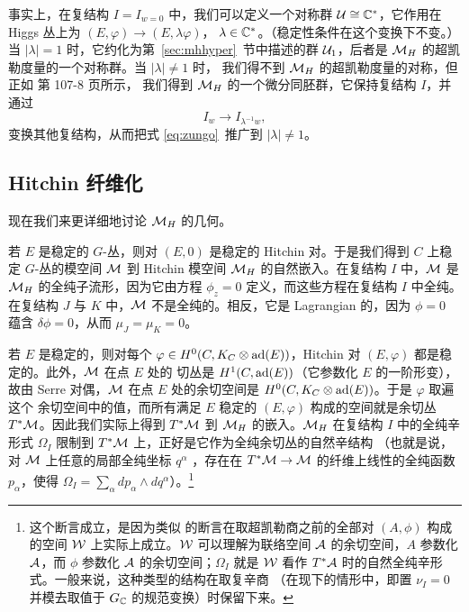 事实上，在复结构 $I=I_{w=0}$ 中，我们可以定义一个对称群 ${\cal U}\cong \Bbb{C}^*$，它作用在
Higgs 丛上为 $(E,\varphi)\to (E,\lambda\varphi)$，
$\lambda\in\Bbb{C}^*$。（稳定性条件在这个变换下不变。）当 $|\lambda|=1$ 时，它约化为第~\ref{sec:mhhyper}~节中描述的群
${\cal U}_1$，后者是 $\MH$ 的超凯勒度量的一个对称群。当 $|\lambda|\not=1$ 时，
我们得不到 $\MH$ 的超凯勒度量的对称，但正如 \cite{ref20} 第 107-8 页所示，
我们得到 $\MH$ 的一个微分同胚群，它保持复结构 $I$，并通过 %
\setcounter{equation}{22}
\begin{equation}\label{eq:trymodo}
I_w\to
I_{\lambda^{-1}w},
\end{equation}
 变换其他复结构，从而把式 \eqref{eq:zungo}\ 推广到
$|\lambda|\not=1$。

\subsection{Hitchin 纤维化}

\label{sec:hitchfib}

现在我们来更详细地讨论 $\MH$ 的几何。

若 $E$ 是稳定的 $G$-丛，则对 $(E,0)$ 是稳定的
Hitchin 对。于是我们得到 $C$ 上稳定 $G$-丛的模空间 $\M$ 到 Hitchin 模空间
$\MH$ 的自然嵌入。在复结构 $I$ 中，$\M$ 是 $\MH$ 的全纯子流形，因为它由方程
$\phi_z=0$ 定义，而这些方程在复结构 $I$ 中全纯。在复结构
$J$ 与 $K$ 中，$\M$ 不是全纯的。相反，它是 Lagrangian 的，因为 $\phi=0$ 蕴含 $\delta\phi=0$，从而
$\mu_J=\mu_K=0$。

若 $E$ 是稳定的，则对每个 $\varphi\in H^0(C,K_C\otimes\ad(E))$，Hitchin 对 $(E,\varphi)$ 都是稳定的。此外，${\EUM}$ 在点 $E$ 处的
切丛是 $H^1(C,\ad(E))$（它参数化 $E$ 的一阶形变），故由 Serre
对偶，$\M$ 在点 $E$ 处的余切空间是
$H^0(C,K_C\otimes\ad(E))$。于是 $\varphi$ 取遍这个
余切空间中的值，而所有满足 $E$ 稳定的 $(E,\varphi)$ 构成的空间就是余切丛
$T^*\M$。因此我们实际上得到
$T^*\M$ 到 $\MH$ 的嵌入。$\MH$ 在复结构 $I$ 中的全纯辛形式
$\Omega_I$ 限制到 $T^*\M$ 上，正好是它作为全纯余切丛的自然辛结构
（也就是说，对 $\M$ 上任意的局部全纯坐标 $q^\alpha$
，存在在 $T^*\M\to \M$ 的纤维上线性的全纯函数 $p_\alpha$，使得
$\Omega_I=\sum_\alpha dp_\alpha\wedge dq^\alpha$）。\footnote{这个断言成立，是因为类似
的断言在取超凯勒商之前的全部对 $(A,\phi)$ 构成的空间 $\EUW$ 上实际上成立。$\EUW$
可以理解为联络空间 ${\EUA}$ 的余切空间，$A$ 参数化 ${\EUA}$，而 $\phi$
参数化 ${\EUA}$ 的余切空间；$\Omega_I$ 就是 ${\EUW}$ 看作
$T^*{\EUA}$ 时的自然全纯辛形式。一般来说，这种类型的结构在取复辛商
（在现下的情形中，即置 $\nu_I=0$ 并模去取值于 $G_{\Bbb{C}}$ 的规范变换）时保留下来。}

